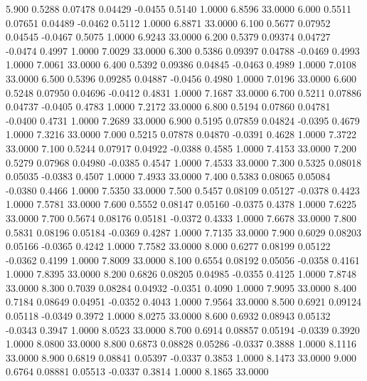    5.900   0.5288   0.07478   0.04429  -0.0455   0.5140   1.0000   6.8596  33.0000
   6.000   0.5511   0.07651   0.04489  -0.0462   0.5112   1.0000   6.8871  33.0000
   6.100   0.5677   0.07952   0.04545  -0.0467   0.5075   1.0000   6.9243  33.0000
   6.200   0.5379   0.09374   0.04727  -0.0474   0.4997   1.0000   7.0029  33.0000
   6.300   0.5386   0.09397   0.04788  -0.0469   0.4993   1.0000   7.0061  33.0000
   6.400   0.5392   0.09386   0.04845  -0.0463   0.4989   1.0000   7.0108  33.0000
   6.500   0.5396   0.09285   0.04887  -0.0456   0.4980   1.0000   7.0196  33.0000
   6.600   0.5248   0.07950   0.04696  -0.0412   0.4831   1.0000   7.1687  33.0000
   6.700   0.5211   0.07886   0.04737  -0.0405   0.4783   1.0000   7.2172  33.0000
   6.800   0.5194   0.07860   0.04781  -0.0400   0.4731   1.0000   7.2689  33.0000
   6.900   0.5195   0.07859   0.04824  -0.0395   0.4679   1.0000   7.3216  33.0000
   7.000   0.5215   0.07878   0.04870  -0.0391   0.4628   1.0000   7.3722  33.0000
   7.100   0.5244   0.07917   0.04922  -0.0388   0.4585   1.0000   7.4153  33.0000
   7.200   0.5279   0.07968   0.04980  -0.0385   0.4547   1.0000   7.4533  33.0000
   7.300   0.5325   0.08018   0.05035  -0.0383   0.4507   1.0000   7.4933  33.0000
   7.400   0.5383   0.08065   0.05084  -0.0380   0.4466   1.0000   7.5350  33.0000
   7.500   0.5457   0.08109   0.05127  -0.0378   0.4423   1.0000   7.5781  33.0000
   7.600   0.5552   0.08147   0.05160  -0.0375   0.4378   1.0000   7.6225  33.0000
   7.700   0.5674   0.08176   0.05181  -0.0372   0.4333   1.0000   7.6678  33.0000
   7.800   0.5831   0.08196   0.05184  -0.0369   0.4287   1.0000   7.7135  33.0000
   7.900   0.6029   0.08203   0.05166  -0.0365   0.4242   1.0000   7.7582  33.0000
   8.000   0.6277   0.08199   0.05122  -0.0362   0.4199   1.0000   7.8009  33.0000
   8.100   0.6554   0.08192   0.05056  -0.0358   0.4161   1.0000   7.8395  33.0000
   8.200   0.6826   0.08205   0.04985  -0.0355   0.4125   1.0000   7.8748  33.0000
   8.300   0.7039   0.08284   0.04932  -0.0351   0.4090   1.0000   7.9095  33.0000
   8.400   0.7184   0.08649   0.04951  -0.0352   0.4043   1.0000   7.9564  33.0000
   8.500   0.6921   0.09124   0.05118  -0.0349   0.3972   1.0000   8.0275  33.0000
   8.600   0.6932   0.08943   0.05132  -0.0343   0.3947   1.0000   8.0523  33.0000
   8.700   0.6914   0.08857   0.05194  -0.0339   0.3920   1.0000   8.0800  33.0000
   8.800   0.6873   0.08828   0.05286  -0.0337   0.3888   1.0000   8.1116  33.0000
   8.900   0.6819   0.08841   0.05397  -0.0337   0.3853   1.0000   8.1473  33.0000
   9.000   0.6764   0.08881   0.05513  -0.0337   0.3814   1.0000   8.1865  33.0000
